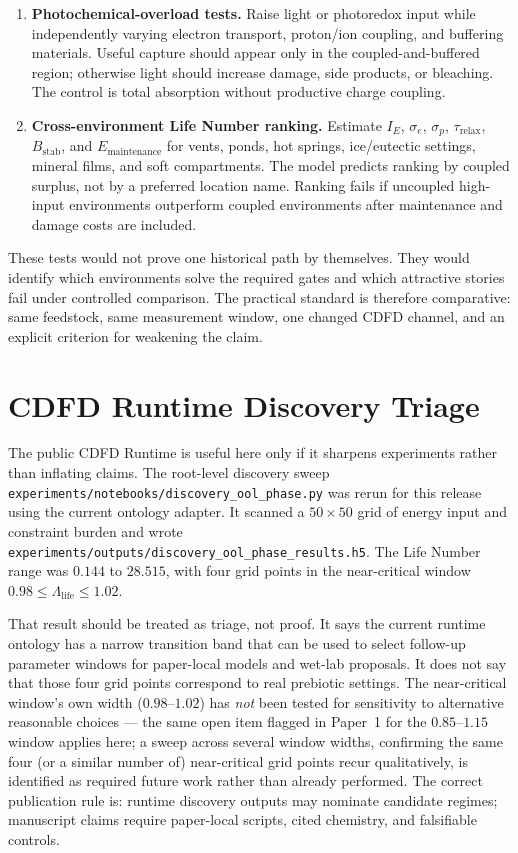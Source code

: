 \documentclass[11pt,a4paper]{article}
\begin{document}
\begin{enumerate}
 \item \textbf{Photochemical-overload tests.} Raise light or photoredox input while independently varying electron transport, proton/ion coupling, and buffering materials. Useful capture should appear only in the coupled-and-buffered region; otherwise light should increase damage, side products, or bleaching. The control is total absorption without productive charge coupling.
 \item \textbf{Cross-environment Life Number ranking.} Estimate $I_E$, $\sigma_e$, $\sigma_p$, $\tau_{\mathrm{relax}}$, $B_{\mathrm{stab}}$, and $E_{\mathrm{maintenance}}$ for vents, ponds, hot springs, ice/eutectic settings, mineral films, and soft compartments. The model predicts ranking by coupled surplus, not by a preferred location name. Ranking fails if uncoupled high-input environments outperform coupled environments after maintenance and damage costs are included.
\end{enumerate}

These tests would not prove one historical path by themselves. They would identify which environments solve the required gates and which attractive stories fail under controlled comparison. The practical standard is therefore comparative: same feedstock, same measurement window, one changed CDFD channel, and an explicit criterion for weakening the claim.

\section{CDFD Runtime Discovery Triage}
The public CDFD Runtime is useful here only if it sharpens experiments rather
than inflating claims. The root-level discovery sweep
\texttt{experiments/notebooks/discovery\_ool\_phase.py} was rerun for this
release using the current ontology adapter. It scanned a $50\times50$ grid of
energy input and constraint burden and wrote
\texttt{experiments/outputs/discovery\_ool\_phase\_results.h5}. The Life Number
range was $0.144$ to $28.515$, with four grid points in the near-critical
window $0.98\leq\Lambda_{\mathrm{life}}\leq1.02$.

That result should be treated as triage, not proof. It says the current
runtime ontology has a narrow transition band that can be used to select
follow-up parameter windows for paper-local models and wet-lab proposals. It
does not say that those four grid points correspond to real prebiotic settings.
The near-critical window's own width ($0.98$--$1.02$) has \emph{not} been tested for
sensitivity to alternative reasonable choices --- the same open item flagged in
Paper~1 for the $0.85$--$1.15$ window applies here; a sweep across several window
widths, confirming the same four (or a similar number of) near-critical grid
points recur qualitatively, is identified as required future work rather than
already performed.
The correct publication rule is: runtime discovery outputs may nominate
candidate regimes; manuscript claims require paper-local scripts, cited
chemistry, and falsifiable controls.
\end{document}
